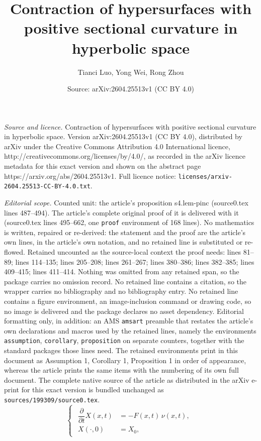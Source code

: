 \documentclass[10pt,a4paper]{amsart}
\title{Contraction of hypersurfaces with positive sectional curvature in hyperbolic space}
\author{Tianci Luo, Yong Wei, Rong Zhou}
\date{Source: arXiv:2604.25513v1 (CC BY 4.0)}
\begin{document}
\maketitle

\noindent\emph{Source and licence.} Contraction of hypersurfaces with positive sectional curvature in hyperbolic space. Version arXiv:2604.25513v1 (CC BY 4.0), distributed by arXiv under the Creative Commons Attribution 4.0 International licence, http://creativecommons.org/licenses/by/4.0/, as recorded in the arXiv licence metadata for this exact version and shown on the abstract page https://arxiv.org/abs/2604.25513v1. Full licence notice: \texttt{licenses/arxiv-2604.25513-CC-BY-4.0.txt}.\par\smallskip

\noindent\textit{Editorial scope.} Counted unit: the article's proposition s4.lem-pinc (source0.tex lines 487--494). The article's complete original proof of it is delivered with it (source0.tex lines 495--662, one \texttt{proof} environment of 168 lines). No mathematics is written, repaired or re-derived: the statement and the proof are the article's own lines, in the article's own notation, and no retained line is substituted or re-flowed.  Retained uncounted as the source-local context the proof needs: lines 81--89; lines 114--135; lines 205--208; lines 261--267; lines 380--386; lines 382--385; lines 409--415; lines 411--414.  Nothing was omitted from any retained span, so the package carries no omission record.  No retained line contains a citation, so the wrapper carries no bibliography and no bibliography entry.  No retained line contains a figure environment, an image-inclusion command or drawing code, so no image is delivered and the package declares no asset dependency.  Editorial formatting only, in addition: an AMS \texttt{amsart} preamble that restates the article's own declarations and macros used by the retained lines, namely the environments \texttt{assumption}, \texttt{corollary}, \texttt{proposition} on separate counters, together with the standard packages those lines need.  The retained environments print in this document as Assumption 1, Corollary 1, Proposition 1 in order of appearance, whereas the article prints the same items with the numbering of its own full document.  The complete native source of the article as distributed in the arXiv e-print for this exact version is bundled unchanged as \texttt{sources/199309/source0.tex}.
\begin{equation}
	\label{equ-f}
	\begin{cases}
		\begin{aligned}
			\dfrac{\partial}{\partial t}X(x,t) & = -F(x,t)\,\nu(x,t), \\
			X(\cdot,0) & = X_0,
		\end{aligned}
	\end{cases}
\end{equation}
\end{document}
